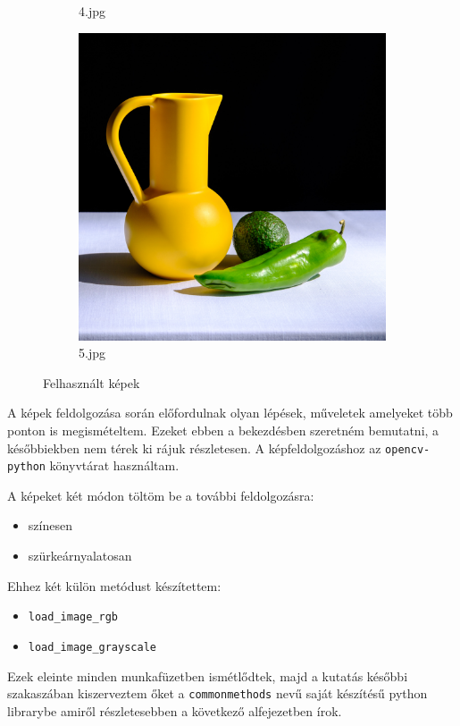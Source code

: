 \begin{figure}[htb]
\begin{subfigure}{0.25\textwidth}
  \caption*{4.jpg}
  \label{fig:4jpg}
\end{subfigure}\hfil %
\begin{subfigure}{0.25\textwidth}
  \includegraphics[width=\linewidth]{../images/5.jpg}
  \caption*{5.jpg}
  \label{fig:5jpg}
\end{subfigure}
\caption{Felhasznált képek}
\label{fig:images}
\end{figure}


A képek feldolgozása során előfordulnak olyan lépések, műveletek amelyeket több ponton is megismételtem. Ezeket ebben a bekezdésben szeretném bemutatni, a későbbiekben nem térek ki rájuk részletesen.
A képfeldolgozáshoz az \texttt{opencv-python} könyvtárat használtam.


A képeket két módon töltöm be a további feldolgozásra:
\begin{itemize}
\item színesen
\item szürkeárnyalatosan
\end{itemize}
Ehhez két külön metódust készítettem:
\begin{itemize}
\item \texttt{load\_image\_rgb}
\item \texttt{load\_image\_grayscale}
\end{itemize}
Ezek eleinte minden munkafüzetben ismétlődtek, majd a kutatás későbbi szakaszában kiszerveztem őket a \texttt{commonmethods} nevű saját készítésű python librarybe amiről részletesebben a következő alfejezetben írok.

